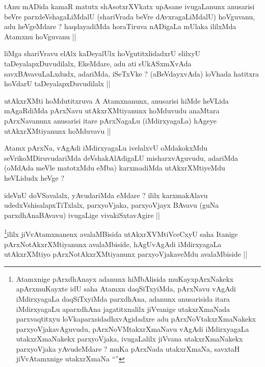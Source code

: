 
\begin{artha}
tAnu mADida kamaR matutx shAsotxrXVkatx upAsane ivugaLanunx anusarisi
beVre parxdeVshagaLiMdalU (shariVrada beVre dAvxragaLiMdalU)
hoVguvanu, adu heVgeMdare ? haqdayadiMda horaTiruva nADigaLa mUlaka
ililxMda Atamxnu hoVguvanu ||
\end{artha}


\begin{artha}
liMga shariVravu elAlx kaDeyalUlx hoVgutitxlidadxrU elilxyU
taDeyalapxDuvudilalx, EkeMdare, adu ati sUkASxmXvAda
savxBAvavuLaLxdudx, adariMda, iSeTxVke ? (aBeVdayxvAda) loVhada
hatitxra hoVdarU taDeyalapxDuvudilalx || 
\end{artha}


\begin{artha}
utAkxrXMti hoMdutitxruva A Atamxnanunx, anusarisi hiMde heVLida
mAgaRdiMda pArxNavu utAkxrXMtiyanunx hoMduvudu anaMtara pArxNavanunx
anusarisi itare pArxNagaLu (iMdirxyagaLa) hAgeye utAkxrXMtiyanunx hoMduvavu ||
\end{artha}


\begin{artha}
Atamx pArxNa, vAgAdi iMdirxyagaLu ivelalxvU oMdakokxMdu
seVrikoMDiruvudariMda deVshakAlAdigaLU misharxvAguvudu, adariMda
(oMdAda meVle matotxMdu eMba) karxmadiMda utAkxrXMtiyeMdu heVLidudx
heVge ? 
\end{artha}

\begin{artha}
ideVnU doVSavalalx, yAvudariMda eMdare ? ililx karxmakAlavu
udedxVshisalapxTiTxlalx, parxyoVjaka, parxyoVjayx BAvavu (guNa
parxdhAnaBAvavu) ivugaLige vivakiSxtavAgire ||
\end{artha}

\begin{artha}
\footnote{Atamxnige pArxdhAnayx adanunx hiMbAlisida muKayxpArxNakekx
  apArxmuKayxte idU saha Atamxn daqSiTxyiMda, pArxNavu vAgAdi
  iMdirxyagaLa daqSiTxyiMda parxdhAna, adanunx anusarisida itara
  iMdirxyagaLu aparxdhAna jagatitxnalilx jiVvanige utakxrXmaNada
  parxvaqtitxyu loVkaparxsidadhxvAgidadxre adu pArxNoVtakxrXmaNakekx
  parxyoVjakavAguvudu, pArxNoVMtakxrXmaNavu vAgAdi iMdirxyagaLa
  utakxrXmaNakekx parxyoVjaka, ivugaLalilx jiVvana utakxrXmaNakekx
  parxyoVjaka yAvudeMdare ? muKa pArxNada utakxrXmaNa, savxtaH
  jiVvAtamxnige utakxrXmaNa ``\stext''}ililx jiVvAtamxnanenx avalaMBisida utAkxrXVMtiVceCxyU saha Itanige
pArxNotAkxrXMtiyanunx avalaMbiside, hAgUvAgAdi iMdirxyagaLa
utAkxrXMtiyo pArxNotAkxrXMtiyanunx parxyoVjakaveMdu avalaMbiside ||
\end{artha}

